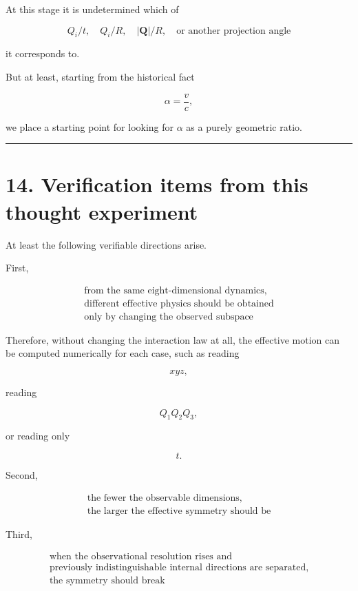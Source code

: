 \documentclass[
  a4paper,
]{article}
\begin{document}
At this stage it is undetermined which of

\[
Q_i/t,
\quad
Q_i/R,
\quad
|\mathbf Q|/R,
\quad
\text{or another projection angle}
\]

it corresponds to.

But at least, starting from the historical fact

\[
\alpha=\frac vc ,
\]

we place a starting point for looking for \(\alpha\) as a purely
geometric ratio.

\begin{center}\rule{0.5\linewidth}{0.5pt}\end{center}

\section{14. Verification items from this thought
experiment}\label{verification-items-from-this-thought-experiment}

At least the following verifiable directions arise.

First,

\[
\boxed{
\begin{array}{c}
\text{from the same eight-dimensional dynamics,}\\
\text{different effective physics should be obtained}\\
\text{only by changing the observed subspace}
\end{array}
}
\]

Therefore, without changing the interaction law at all, the effective
motion can be computed numerically for each case, such as reading

\[
xyz ,
\]

reading

\[
Q_1Q_2Q_3 ,
\]

or reading only

\[
t .
\]

Second,

\[
\boxed{
\begin{array}{c}
\text{the fewer the observable dimensions,}\\
\text{the larger the effective symmetry should be}
\end{array}
}
\]

Third,

\[
\boxed{
\begin{array}{c}
\text{when the observational resolution rises and}\\
\text{previously indistinguishable internal directions are separated,}\\
\text{the symmetry should break}
\end{array}
}
\]
\end{document}
